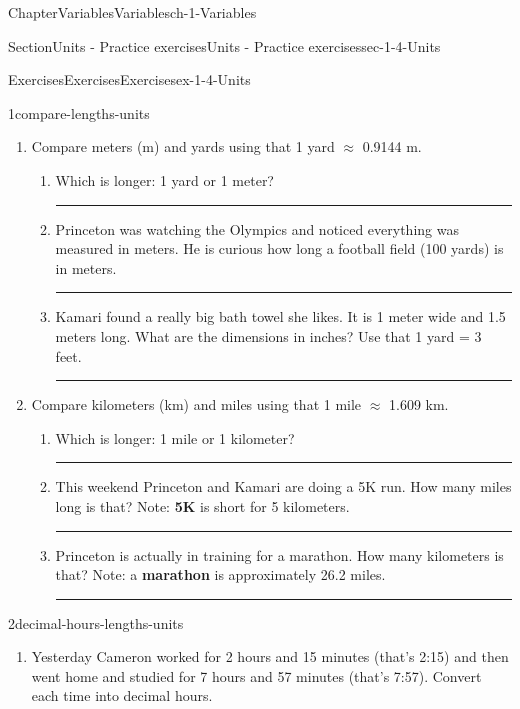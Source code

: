 \documentclass[twoside,11pt,]{book}
\newcommand{\terminology}[1]{\textbf{#1}}
\newlength{\workspacestrutwidth}
\numberwithin{equation}{section}
\begin{document}
\begin{chapterptx}{Chapter}{Variables}{}{Variables}{}{}{ch-1-Variables}
\begin{sectionptx}{Section}{Units - Practice exercises}{}{Units - Practice exercises}{}{}{sec-1-4-Units}
\begin{exercises-subsection-numberless}{Exercises}{Exercises}{}{Exercises}{}{}{ex-1-4-Units}
\begin{divisionexercise}{1}{}{}{compare-lengths-units}
\begin{enumerate}[label=(\alph*),ref=\alph*]
\begin{enumerate}[label=\roman*.,ref=\theenumi.\roman*]
\par\rule{\workspacestrutwidth}{1cm}%
\end{enumerate}%
\item{}Compare meters (m) and yards using that 1 yard \(\approx\) 0.9144 m.%
\begin{enumerate}[label=\roman*.,ref=\theenumi.\roman*]%
\item{}Which is longer: 1 yard or 1 meter?%
\par\rule{\workspacestrutwidth}{0cm}%
\item{}Princeton was watching the Olympics and noticed everything was measured in meters. He is curious how long a football field (100 yards) is in meters.%
\par\rule{\workspacestrutwidth}{1cm}%
\item{}Kamari found a really big bath towel she likes. It is 1 meter wide and 1.5 meters long. What are the dimensions in inches? Use that 1 yard = 3 feet.%
\par\rule{\workspacestrutwidth}{1cm}%
\end{enumerate}%
\item{}Compare kilometers (km) and miles using that 1 mile \(\approx\) 1.609 km.%
\begin{enumerate}[label=\roman*.,ref=\theenumi.\roman*]%
\item{}Which is longer: 1 mile or 1 kilometer?%
\par\rule{\workspacestrutwidth}{0cm}%
\item{}This weekend Princeton and Kamari are doing a 5K run. How many miles long is that? Note: \terminology{5K} is short for 5 kilometers.%
\par\rule{\workspacestrutwidth}{1cm}%
\item{}Princeton is actually in training for a marathon. How many kilometers is that? Note: a \terminology{marathon} is approximately 26.2 miles.%
\par\rule{\workspacestrutwidth}{0in}%
\end{enumerate}%
\end{enumerate}%
\end{divisionexercise}%
\clearpage
\begin{divisionexercise}{2}{}{}{decimal-hours-lengths-units}%
\vspace{-\baselineskip-\parsep}%
\begin{enumerate}[label=(\alph*),ref=\alph*]%
\item{}Yesterday Cameron worked for 2 hours and 15 minutes (that's 2:15) and then went home and studied for 7 hours and 57 minutes (that's 7:57). Convert each time into decimal hours.%

\end{enumerate}
\end{divisionexercise}
\end{exercises-subsection-numberless}
\end{sectionptx}
\end{chapterptx}
\end{document}
